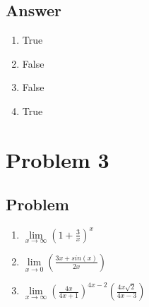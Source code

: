 \documentclass{article}
\newcommand\tab[1][1cm]{\hspace*{#1}}
\begin{document}
\subsection*{Answer}
\begin{enumerate}[label=(\alph*)]
	\item True
	\item False
	\item False
	\item True
\end{enumerate}
\section*{Problem 3}
\subsection*{Problem}
\begin{enumerate}[label=(\alph*)]
	\item \tab \(\lim\limits_{x\to \infty}(1 + \frac{3}{x})^{x}\)
	\item \tab \(\lim\limits_{x \to 0}(\frac{3x + sin(x)}{2x})\)
	\item \tab \(\lim\limits_{x \to \infty}(\frac{4x}{4x+1})^{4x-2}(\frac{4x\sqrt{2}}{4x-3})\)
\end{enumerate}
\end{document}
